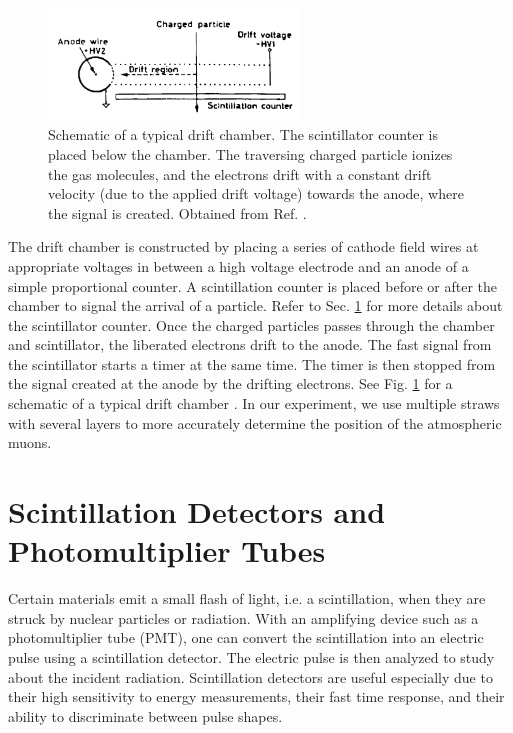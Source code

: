 \documentclass[a4paper]{report}
\numberwithin{equation}{section}
\begin{document}
\begin{figure}[!hb]
	\centering
	\includegraphics[width=0.6\textwidth]{drift_chamber.png}
	\caption{Schematic of a typical drift chamber. The scintillator counter is placed below the chamber. The 
	traversing charged particle ionizes the gas molecules, and the electrons drift with a constant drift velocity (due to the 
	applied drift voltage) towards the 
	anode, where the signal is created. Obtained from Ref. \cite{Leo1994}.}
	\label{fig:drift_chamber}	
\end{figure}


The drift chamber is constructed by placing a series of cathode field wires at appropriate voltages in between a high voltage electrode and 
an anode of a simple proportional counter. A scintillation counter is placed before or after the chamber to signal the arrival of a particle. Refer to 
Sec.  \ref{sec:scint_pmt} for more details about the scintillator counter. 
Once the charged particles passes through the chamber and scintillator, the liberated electrons drift to the anode. The fast signal from the scintillator
starts a timer at the same time. The timer is then stopped from the signal created at the anode by the drifting electrons. See Fig. \ref{fig:drift_chamber} for a schematic of a typical 
drift chamber \cite{Leo1994}. In our experiment, we use multiple straws with several layers to more accurately determine the position of the 
atmospheric muons. \par 

\section{Scintillation Detectors and Photomultiplier Tubes} \label{sec:scint_pmt}

Certain materials emit a small flash of light, i.e. a scintillation, when they are struck by nuclear particles or radiation.
With an amplifying device such as a photomultiplier tube (PMT), one can convert the scintillation into an electric pulse
using a scintillation detector. The electric pulse is then analyzed to study about the incident radiation. Scintillation detectors 
are useful especially due to their high sensitivity to energy measurements, their fast time response, and their ability 
to discriminate between pulse shapes. \par 
\end{document}
